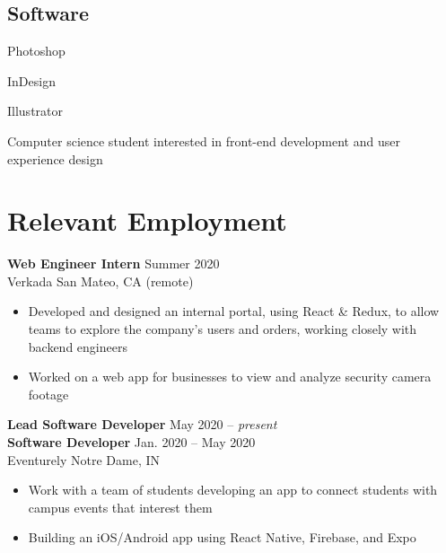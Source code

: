 \documentclass[letterpaper,10pt]{article}
\newcommand{\present}[0]{{\itshape present}}
\begin{document}
\begin{minipage}[t]{\dimexpr.33\textwidth-.5\columnsep}
\begin{flushleft}
\begin{minipage}[t]{.5\textwidth}
\subsection{Software}
\begin{skillslist}
    \item Photoshop
    \item InDesign
    \item Illustrator
\end{skillslist}

\end{minipage}

\end{flushleft}
\end{minipage}
\hfill
\begin{minipage}[t]{\dimexpr.67\textwidth-.5\columnsep}

\begin{center}
    {\Huge\ttfamily\bfseries \uppercase{}}

    \medskip
    {\large\ttfamily Computer science student interested in front-end development and user experience design}
\end{center}

\section{Relevant Employment}

\textbf{Web Engineer Intern} \hfill Summer 2020 \\
Verkada \hfill San Mateo, CA (remote)
\begin{itemize}
    \item Developed and designed an internal portal, using React \& Redux, to allow teams to explore the company's users and orders, working closely with backend engineers
    \item Worked on a web app for businesses to view and analyze security camera footage
\end{itemize}

\textbf{Lead Software Developer} \hfill May 2020 -- \present{} \\
\textbf{Software Developer} \hfill Jan. 2020 -- May 2020 \\
Eventurely \hfill Notre Dame, IN
\begin{itemize}
    \item Work with a team of students developing an app to connect students with campus events that interest them
    \item Building an iOS/Android app using React Native, Firebase, and Expo
\end{itemize}


\end{minipage}
\end{document}

